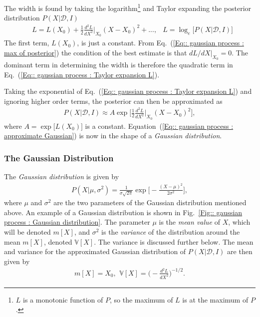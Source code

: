 \documentclass[twoside,english]{uiofysmaster}
\begin{document}
{{The width is found by taking the logarithm\footnote{$L$ is a monotonic function of $P$, so the maximum of $L$ is at the maximum of $P$.} and Taylor expanding the posterior distribution $P(X| \mathcal{D}, I)$
\begin{align}
&L = L(X_0) + \frac{1}{2} \frac{d^2L}{dX^2}\Big|_{X_0} (X-X_0)^2 +... ,&L = \log_e \Big[P(X | \mathcal{D}, I ) \Big]\label{Eq:: gaussian process : Taylor expansion L}
\end{align}
The first term, $L(X_0)$, is just a constant. From Eq.~(\ref{Eq:: gaussian process : max of posterior}) the condition of the best estimate is that $dL/dX|_{X_0} =0$. The dominant term in determining the width is therefore the quadratic term in Eq.~(\ref{Eq:: gaussian process : Taylor expansion L}).

Taking the exponential of Eq.~(\ref{Eq:: gaussian process : Taylor expansion L}) and ignoring higher order terms, the posterior can then be approximated as
\begin{align}\label{Eq:: gaussian process : approximate Gaussian}
P(X | \mathcal{D}, I) \approx A \exp \Bigg[ \frac{1}{2} \frac{d^2L}{dX^2}\Big|_{X_0} (X-X_0)^2 \Bigg], 
\end{align} 
where $A = \exp \big[L(X_0) \big]$ is a constant. Equation~(\ref{Eq:: gaussian process : approximate Gaussian}) is now in the shape of a \textit{Gaussian distribution}.

\subsubsection{The Gaussian Distribution}\label{Sec:: gaussian process : The Gaussian Distribution}


The \textit{Gaussian distribution} is given by
\begin{align}
P(X| \mu, \sigma^2) = \frac{1}{\sigma \sqrt{2 \pi}} \exp \Bigg[ - \frac{(X- \mu)^2}{2 \sigma^2} \Bigg],
\end{align}
where $\mu$ and $\sigma^2$ are the two parameters of the Gaussian distribution mentioned above. An example of a Gaussian distribution is shown in Fig.~\ref{Fig:: gaussian process : Gaussian distribution}. The parameter $\mu$ is the \textit{mean value} of $X$, which will be denoted $ m[X]$, and $\sigma^2$ is the \textit{variance} of the distribution around the mean $m[X]$, denoted $\mathbb{V}[X]$. The variance is discussed further below. The mean and variance for the approximated Gaussian distribution of $P(X|\mathcal{D}, I)$ are then given by
\begin{align}
m[X] = X_0\text{, }~ \mathbb{V}[X] = \Big( - \frac{d^2L}{dX^2} \Big)^{-1/2}.
\end{align}

}}
\end{document}

